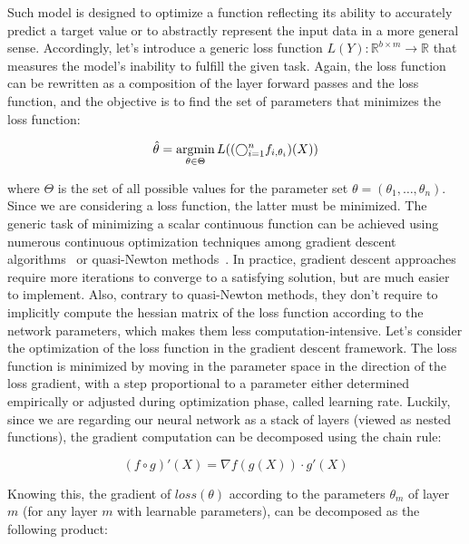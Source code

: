         Such model is designed to optimize a function reflecting its ability to accurately predict a target value or to abstractly represent the input 
        data in a more general sense. Accordingly, let's introduce a generic loss function $L(Y): \mathbb{R}^{b \times m} \rightarrow \mathbb{R}$ that measures 
        the model's inability to fulfill the given task. Again, the loss function can be rewritten as a composition of the layer forward passes and the loss
        function, and the objective is to find the set of parameters that minimizes the loss function:

        \begin{equation}
            \hat{\theta} = \operatorname*{argmin}_{\theta \in \Theta} L((\bigcirc_{i=1}^{n} f_{i, \theta_i})(X))
        \end{equation}

        where $\Theta$ is the set of all possible values for the parameter set $\theta = (\theta_1, \ldots, \theta_n)$.
        Since we are considering a loss function, the latter must be minimized. The generic task of minimizing a scalar continuous function can be achieved
        using numerous continuous optimization techniques  among gradient descent algorithms~\cite{DBLP:journals/corr/Ruder16}
        or quasi-Newton methods~\cite{LBFGS}. In practice, gradient descent approaches require more iterations to converge to a satisfying solution,
        but are much easier to implement. Also, contrary to quasi-Newton methods, they don't require to implicitly compute the hessian matrix of the loss
        function according to the network parameters, which makes them less computation-intensive. Let's consider the optimization of the loss function
        in the gradient descent framework. The loss function is minimized by moving in the parameter space in the direction of the loss gradient, with
        a step proportional to a parameter either determined empirically or adjusted during optimization phase, called learning rate.
        Luckily, since we are regarding our neural network as a stack of layers (viewed as nested functions), the gradient computation can be decomposed
        using the chain rule:

        \begin{equation} \label{eq:backprop}
            (f \circ g)'(X) = \nabla f(g(X)) \cdot g'(X)
        \end{equation}

        Knowing this, the gradient of $loss(\theta)$ according to the parameters $\theta_m$ of layer $m$ (for any layer $m$ with learnable parameters),
        can be decomposed as the following product:

